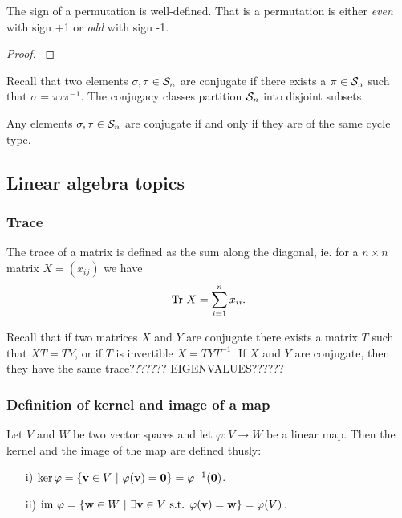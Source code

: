 \begin{proposition}\label{prop:signwelldefined}
	The sign of a permutation is well-defined. That is a permutation is either \textit{even} with sign +1 or \textit{odd} with sign -1.
\end{proposition}
\begin{proof}
	\cite[Thm.12.6.1.]{Biggs}
\end{proof}

Recall that two elements $\sigma, \tau \in \mathcal{S}_n$ are conjugate if there exists a $\pi \in \mathcal{S}_n$ such that $\sigma = \pi \tau \pi^{-1}$. The conjugacy classes partition $\mathcal{S}_n$ into disjoint subsets. 

\begin{proposition}
	Any elements $\sigma, \tau \in \mathcal{S}_n$ are conjugate if and only if they are of the same cycle type.
\end{proposition}





\subsection{Linear algebra topics}

	\subsubsection{Trace}
		
		The trace of a matrix is defined as the sum along the diagonal, ie. for a $n \times n$ matrix $X = (x_{ij})$ we have
		\begin{align*}
			\text{Tr } X = \sum_{i=1}^{n} x_{ii}.
		\end{align*}
		
		Recall that if two matrices $X$ and $Y$ are conjugate there exists a matrix $T$ such that $XT = TY$, or if $T$ is invertible $X = TYT^{-1}$. If $X$ and $Y$ are conjugate, then they have the same trace??????? EIGENVALUES??????

	\subsubsection{Definition of kernel and image of a map}
	
	\begin{definition}\label{def:kernelimage}
		Let $V$ and $W$ be two vector spaces and let $\varphi: V \rightarrow W$ be a linear map. Then the kernel and the image of the map are defined thusly:
		\begin{itemize}
			\item[i)] $\ker \varphi = \left\lbrace \mathbf{v} \in V \ \middle\vert \ \varphi(\mathbf{v}) = \mathbf{0} \right\rbrace = \varphi^{-1}(\mathbf{0})$.
			\item[ii)] $\text{im } \varphi = \left\lbrace \mathbf{w} \in W \ \middle\vert \ \exists \mathbf{v} \in V \text{ s.t. } \varphi(\mathbf{v}) = \mathbf{w} \right\rbrace = \varphi(V)$.
		\end{itemize}
	\end{definition}
	
